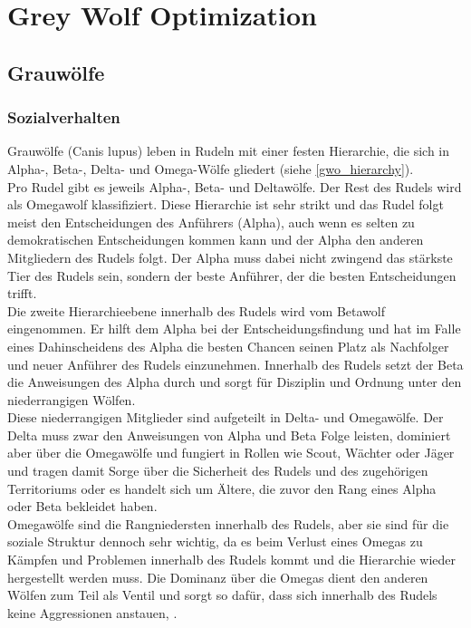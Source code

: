 \chapter{Grey Wolf Optimization}

\section{Grauwölfe}
\subsection{Sozialverhalten}
Grauwölfe (Canis lupus) leben in Rudeln mit einer festen Hierarchie, die sich in Alpha-, Beta-, Delta- und Omega-Wölfe gliedert (siehe \autoref{gwo_hierarchy}). \\
Pro Rudel gibt es jeweils  Alpha-, Beta- und Deltawölfe. Der Rest des Rudels wird als Omegawolf klassifiziert. Diese Hierarchie ist sehr strikt und das Rudel folgt meist den Entscheidungen des Anführers (Alpha), auch wenn es selten zu demokratischen Entscheidungen kommen kann und der Alpha den anderen Mitgliedern des Rudels folgt. Der Alpha muss dabei nicht zwingend das stärkste Tier des Rudels sein, sondern der beste Anführer, der die besten Entscheidungen trifft. \\
Die zweite Hierarchieebene innerhalb des Rudels wird vom Betawolf eingenommen. Er hilft dem Alpha bei der Entscheidungsfindung und hat im Falle eines Dahinscheidens des Alpha die besten Chancen seinen Platz als Nachfolger und neuer Anführer des Rudels einzunehmen. Innerhalb des Rudels setzt der Beta die Anweisungen des Alpha durch und sorgt für Disziplin und Ordnung unter den niederrangigen Wölfen.\\
Diese niederrangigen Mitglieder sind aufgeteilt in Delta- und Omegawölfe. Der Delta muss zwar den Anweisungen von Alpha und Beta Folge leisten, dominiert aber über die Omegawölfe und fungiert in Rollen wie Scout, Wächter oder Jäger und tragen damit Sorge über die Sicherheit des Rudels und des zugehörigen Territoriums oder es handelt sich um Ältere, die zuvor den Rang eines Alpha oder Beta bekleidet haben.\\
Omegawölfe sind die Rangniedersten innerhalb des Rudels, aber sie sind für die soziale Struktur dennoch sehr wichtig, da es beim Verlust eines Omegas zu Kämpfen und Problemen innerhalb des Rudels kommt und die Hierarchie wieder hergestellt werden muss. Die Dominanz über die Omegas dient den anderen Wölfen zum Teil als Ventil und sorgt so dafür, dass sich innerhalb des Rudels keine Aggressionen anstauen, \cite[vgl. Mirjalili 2014, S.4f]{MIRJALILI201446}.\\

